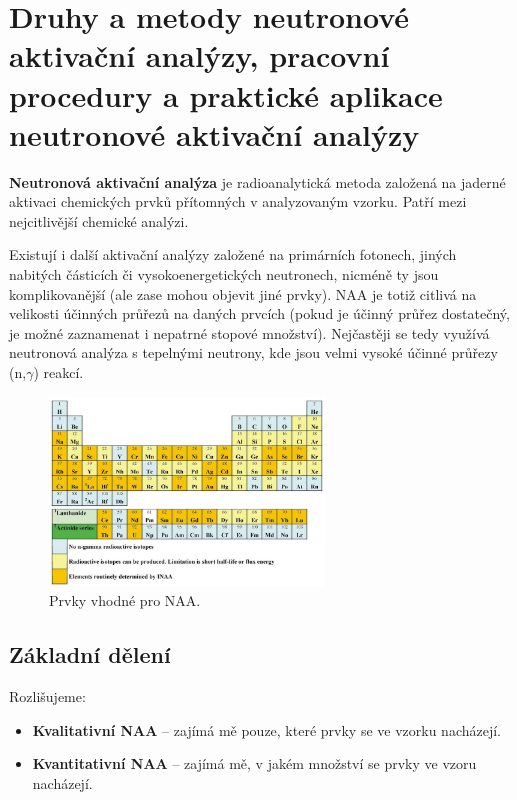 \section[Aktivační analýza]{Druhy a metody neutronové aktivační analýzy, pracovní procedury a praktické aplikace neutronové aktivační analýzy}

\textbf{Neutronová aktivační analýza} je radioanalytická metoda založená na jaderné aktivaci chemických prvků přítomných v analyzovaným vzorku. Patří mezi nejcitlivější chemické analýzi.

Existují i další aktivační analýzy založené na primárních fotonech, jiných nabitých částicích či vysokoenergetických neutronech, nicméně ty jsou komplikovanější (ale zase mohou objevit jiné prvky). NAA je totiž citlivá na velikosti účinných průřezů na daných prvcích (pokud je účinný průřez dostatečný, je možné zaznamenat i nepatrné stopové množství). Nejčastěji se tedy využívá neutronová analýza s tepelnými neutrony, kde jsou velmi vysoké účinné průřezy (n,$\gamma$) reakcí.

\begin{figure}[H]
    \centering
    \includegraphics[width=0.65\textwidth]{img/prvky_NAA.JPG}
    \caption{Prvky vhodné pro NAA.}
\end{figure}

\subsection{Základní dělení}

Rozlišujeme:

\begin{itemize}
    \item \textbf{Kvalitativní NAA} -- zajímá mě pouze, které prvky se ve vzorku nacházejí.
    \item \textbf{Kvantitativní NAA} -- zajímá mě, v jakém množství se prvky ve vzoru nacházejí.
\end{itemize}

